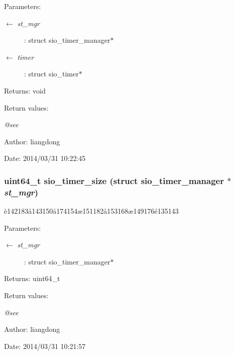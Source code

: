 \begin{Desc}
\item[Parameters:]
\begin{description}
\item[\mbox{$\leftarrow$} {\em st\_\-mgr}]: struct sio\_\-timer\_\-manager$\ast$ \item[\mbox{$\leftarrow$} {\em timer}]: struct sio\_\-timer$\ast$ \end{description}
\end{Desc}
\begin{Desc}
\item[Returns:]void \end{Desc}
\begin{Desc}
\item[Return values:]
\begin{description}
\item[{\em @see}]\end{description}
\end{Desc}
\begin{Desc}
\item[Author:]liangdong \end{Desc}
\begin{Desc}
\item[Date:]2014/03/31 10:22:45 \end{Desc}
\subsubsection{\setlength{\rightskip}{0pt plus 5cm}uint64\_\-t sio\_\-timer\_\-size (struct sio\_\-timer\_\-manager $\ast$ {\em st\_\-mgr})}\label{sio__timer_8h_a3}


\`{e}142183\aa{}143150\aa{}174154\ae{}151182\aa{}153168\ae{}149176\'{e}135143 

\begin{Desc}
\item[Parameters:]
\begin{description}
\item[\mbox{$\leftarrow$} {\em st\_\-mgr}]: struct sio\_\-timer\_\-manager$\ast$ \end{description}
\end{Desc}
\begin{Desc}
\item[Returns:]uint64\_\-t \end{Desc}
\begin{Desc}
\item[Return values:]
\begin{description}
\item[{\em @see}]\end{description}
\end{Desc}
\begin{Desc}
\item[Author:]liangdong \end{Desc}
\begin{Desc}
\item[Date:]2014/03/31 10:21:57 \end{Desc}
